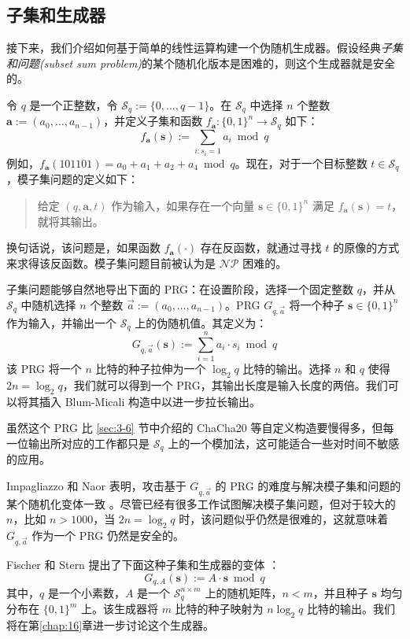 \subsection{子集和生成器}

接下来，我们介绍如何基于简单的线性运算构建一个伪随机生成器。假设经典\emph{子集和问题(subset sum problem)}的某个随机化版本是困难的，则这个生成器就是安全的。

\begin{snote}[模子集问题。]
令 $q$ 是一个正整数，令 $\mathcal{S}_q:=\{0,\dots,q-1\}$。在 $\mathcal{S}_q$ 中选择 $n$ 个整数 $\boldsymbol{a}:=(a_0,\dots,a_{n-1})$，并定义子集和函数 $f_{\boldsymbol{a}}:\{0,1\}^n\to\mathcal{S}_q$ 如下：
\[
f_{\boldsymbol{a}}(\boldsymbol{s})
:=\sum_{i: s_i=1}a_i\bmod q
\]
例如，$f_{\boldsymbol{a}}(101101)=a_0+a_1+a_2+a_4\bmod q$。现在，对于一个目标整数 $t\in\mathcal{S}_q$，模子集问题的定义如下：
\begin{quote}
给定 $(q,\boldsymbol{a},t)$ 作为输入，如果存在一个向量 $\boldsymbol{s}\in\{0,1\}^n$ 满足 $f_{\boldsymbol{a}}(\boldsymbol{s})=t$，就将其输出。
\end{quote}
换句话说，该问题是，如果函数 $f_{\boldsymbol{a}}(\cdot)$ 存在反函数，就通过寻找 $t$ 的原像的方式来求得该反函数。模子集问题目前被认为是 $\mathcal{NP}$ 困难的。
\end{snote}

\begin{snote}[子集和与PRG。]
子集问题能够自然地导出下面的 PRG：在设置阶段，选择一个固定整数 $q$，并从 $\mathcal{S}_q$ 中随机选择 $n$ 个整数 $\vec{a}:=(a_0,\dots,a_{n-1})$。PRG $G_{q,\vec{a}}$ 将一个种子 $\boldsymbol{s}\in\{0,1\}^n$ 作为输入，并输出一个 $\mathcal{S}_q$ 上的伪随机值。其定义为：
\[
G_{q,\vec{a}}(\boldsymbol{s})
:=\sum_{i=1}^na_i\cdot s_i\bmod q
\]
该 PRG 将一个 $n$ 比特的种子拉伸为一个 $\log_2q$ 比特的输出。选择 $n$ 和 $q$ 使得 $2n=\log_2q$，我们就可以得到一个 PRG，其输出长度是输入长度的两倍。我们可以将其插入 Blum-Micali 构造中以进一步拉长输出。

虽然这个 PRG 比 \ref{sec:3-6} 节中介绍的 ChaCha20 等自定义构造要慢得多，但每一位输出所对应的工作都只是 $\mathcal{S}_q$ 上的一个模加法，这可能适合一些对时间不敏感的应用。

Impagliazzo 和 Naor 表明，攻击基于 $G_{q,\vec{a}}$ 的 PRG 的难度与解决模子集和问题的某个随机化变体一致 \cite{impagliazzo1996efficient}。尽管已经有很多工作试图解决模子集问题，但对于较大的 $n$，比如 $n>1000$，当 $2n=\log_2q$ 时，该问题似乎仍然是很难的，这就意味着 $G_{q,\vec{a}}$ 作为一个 PRG 仍然是安全的。
\end{snote}

\begin{snote}[变体。]
Fischer 和 Stern 提出了下面这种子集和生成器的变体 \cite{fischer1996efficient}：
\[
G_{q,A}(\boldsymbol{s})
:=A\cdot\boldsymbol{s}\bmod q
\]
其中，$q$ 是一个小素数，$A$ 是一个 $\mathcal{S}_q^{n\times m}$ 上的随机矩阵，$n<m$，并且种子 $\boldsymbol{s}$ 均匀分布在 $\{0,1\}^m$ 上。该生成器将 $m$ 比特的种子映射为 $n\log_2q$ 比特的输出。我们将在第\ref{chap:16}章进一步讨论这个生成器。
\end{snote}